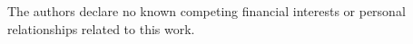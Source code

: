 The authors declare no known competing financial interests or personal relationships related to this work.
